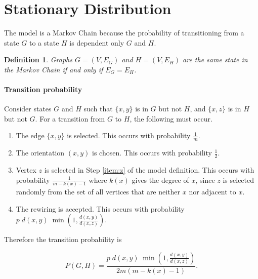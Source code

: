 \documentclass[a4paper,10pt]{article}
\newtheorem{defn}{Definition}
\begin{document}
\section{Stationary Distribution}
The model is a Markov Chain because the probability of transitioning from a state $G$ to a state $H$ is dependent only $G$ and $H$. 

\begin{defn}
 Graphs $G = (V, E_G)$ and $H = (V, E_H)$ are the same state in the Markov Chain if and only if $E_G = E_H$.
\end{defn}


\paragraph{Transition probability} Consider states $G$ and $H$ such that $\{x, y\}$ is in $G$ but not $H$, and $\{x, z\}$ is in $H$ but not $G$. For a transition from $G$ to $H$, the following must occur.
\begin{enumerate}
 \item The edge $\{x, y\}$ is selected. This occurs with probability $\frac{1}{m}$.
 \item The orientation $(x, y)$ is chosen. This occurs with probability $\frac{1}{2}$.
 \item Vertex $z$ is selected in Step \ref{item:z} of the model definition. This occurs with probability $\frac{1}{m - k(x) - 1}$ where $k(x)$ gives the degree of $x$, since $z$ is selected randomly from the set of all vertices that are neither $x$ nor adjacent to $x$.
 \item The rewiring is accepted. This occurs with probability $ p \; d(x, y) \; \min(1, \frac{d(x, y)}{d(x, z)}).$
\end{enumerate}
Therefore the transition probability is 

\begin{equation}
\label{eqn:pgh}
 P(G, H) = \frac{ p \; d(x, y) \; \min\left(1, \frac{d(x, y)}{d(x, z)}\right)}{2m \left(m - k(x) - 1\right)}.
\end{equation}
\end{document}
